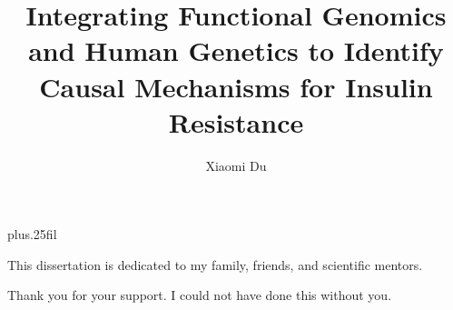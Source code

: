 \documentclass[11pt]{formatting-template}
\title{Integrating Functional Genomics and Human Genetics to Identify Causal Mechanisms for Insulin Resistance}
\author{Xiaomi Du}
\begin{document}
\frontmatter
\maketitle{}
\makecopyright{}
\makesignature{}

\begin{dedication}
	\setsinglespacing{}
	\parindent0pt\parskip\baselineskip{}
	\vskip0pt plus.25fil
	\begin{center}
		
		This dissertation is dedicated to my family, friends, and scientific mentors.
		
		Thank you for your support. I could not have done this without you. 
		
	\end{center}
\end{dedication}


\tableofcontents
\listoffigures
\listoftables
\end{document}
